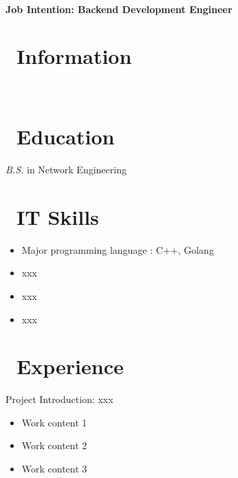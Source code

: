 \documentclass{resume}
\begin{document}


  \hfill \vspace{2mm} \\
\textbf{Job Intention: Backend Development Engineer}

\section{\faInfo\ Information} \vspace{1mm}
{\phone {} \qquad\qquad\quad
\email {} \vspace{2mm} \\
\github {} \qquad
\faLink {}}

\section{\faGraduationCap\ Education} \vspace{1mm}
 \vspace{1mm}
\textit{B.S.} in Network Engineering

\section{\faCogs\ IT Skills} \vspace{1mm}
\begin{itemize}[parsep=1ex]
  \item Major programming language : C++, Golang
  \item xxx
  \item xxx
  \item xxx
\end{itemize}

\section{\faUsers\ Experience}
Project Introduction: xxx
\begin{itemize}[parsep=1ex]
  \item Work content 1
  \item Work content 2
  \item Work content 3
\end{itemize} \vspace{1mm}
\end{document}
